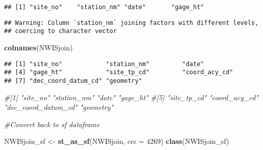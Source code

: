 \documentclass[]{article}
\newenvironment{Shaded}{\begin{snugshade}}{\end{snugshade}}
\newcommand{\KeywordTok}[1]{\textcolor[rgb]{0.13,0.29,0.53}{\textbf{#1}}}
\newcommand{\DataTypeTok}[1]{\textcolor[rgb]{0.13,0.29,0.53}{#1}}
\newcommand{\DecValTok}[1]{\textcolor[rgb]{0.00,0.00,0.81}{#1}}
\newcommand{\StringTok}[1]{\textcolor[rgb]{0.31,0.60,0.02}{#1}}
\newcommand{\CommentTok}[1]{\textcolor[rgb]{0.56,0.35,0.01}{\textit{#1}}}
\newcommand{\OperatorTok}[1]{\textcolor[rgb]{0.81,0.36,0.00}{\textbf{#1}}}
\newcommand{\NormalTok}[1]{#1}
\begin{document}
\begin{verbatim}
## [1] "site_no"    "station_nm" "date"       "gage_ht"
\end{verbatim}

\begin{Shaded}
\end{Shaded}

\begin{verbatim}
## Warning: Column `station_nm` joining factors with different levels,
## coercing to character vector
\end{verbatim}

\begin{Shaded}
\begin{Highlighting}[]
\KeywordTok{colnames}\NormalTok{(NWISjoin)}
\end{Highlighting}
\end{Shaded}

\begin{verbatim}
## [1] "site_no"            "station_nm"         "date"              
## [4] "gage_ht"            "site_tp_cd"         "coord_acy_cd"      
## [7] "dec_coord_datum_cd" "geometry"
\end{verbatim}

\begin{Shaded}
\begin{Highlighting}[]
\CommentTok{#[1] "site_no"            "station_nm"         "date"               "gage_ht"           }
\CommentTok{#[5] "site_tp_cd"         "coord_acy_cd"       "dec_coord_datum_cd" "geometry"}

\CommentTok{#Convert back to sf dataframe}

\NormalTok{NWISjoin_sf <-}\StringTok{ }\KeywordTok{st_as_sf}\NormalTok{(NWISjoin, }\DataTypeTok{crs =} \DecValTok{4269}\NormalTok{)}
\KeywordTok{class}\NormalTok{(NWISjoin_sf)}
\end{Highlighting}
\end{Shaded}
\end{document}
